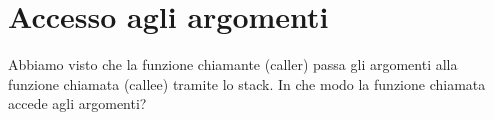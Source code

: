 \section{Accesso agli argomenti}
\myindex{\Stack}

Abbiamo visto che la funzione chiamante (\gls{caller}) passa gli argomenti alla funzione chiamata (\gls{callee}) tramite lo stack.
In che modo la funzione chiamata accede agli argomenti?







